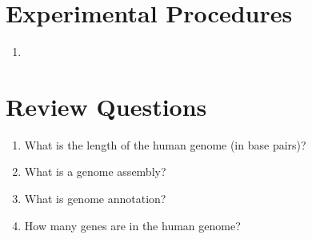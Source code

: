 \documentclass[]{book}
\providecommand{\tightlist}{%
  \setlength{\itemsep}{0pt}\setlength{\parskip}{0pt}}
\theoremstyle{definition}
\theoremstyle{definition}
\theoremstyle{definition}
\theoremstyle{remark}
\begin{document}
\section{Experimental Procedures}\label{experimental-procedures-20}

\begin{enumerate}
\def\labelenumi{\arabic{enumi}.}
\item
\end{enumerate}

\section{Review Questions}\label{review-questions-10}

\begin{enumerate}
\def\labelenumi{\arabic{enumi}.}
\tightlist
\item
  What is the length of the human genome (in base pairs)?
\item
  What is a genome assembly?
\item
  What is genome annotation?
\item
  How many genes are in the human genome?
\end{enumerate}
\end{document}

